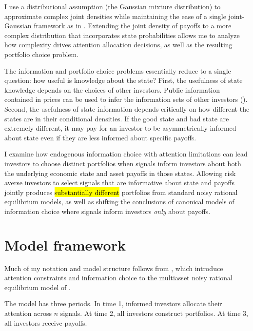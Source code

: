 \documentclass{article}
\begin{document}
I use a distributional assumption (the Gaussian mixture distribution) to approximate complex joint densities while maintaining the ease of a single joint-Gaussian framework as in \textcite{kacperczyk_rational_2016}. Extending the joint density of payoffs to a more complex distribution that incorporates state probabilities allows me to analyze how complexity drives attention allocation decisions, as well as the resulting portfolio choice problem.

The information and portfolio choice problems essentially reduce to a single question: how useful is knowledge about the state? First, the usefulness of state knowledge depends on the choices of other investors. Public information contained in prices can be used to infer the information sets of other investors (\textcite{grossman_existence_1977}). Second, the usefulness of state information depends critically on how different the states are in their conditional densities. If the good state and bad state are extremely different, it may pay for an investor to be asymmetrically informed about state even if they are less informed about specific payoffs.

I examine how endogenous information choice with attention limitations can lead investors to choose distinct portfolios when signals inform investors about both the underlying economic state and asset payoffs in those states. Allowing risk averse investors to select signals that are informative about state and payoffs jointly produces \hl{substantially different}  portfolios from standard noisy rational equilibrium models, as well as shifting the conclusions of canonical models of information choice where signals inform investors \textit{only} about payoffs.


\section{Model framework}

Much of my notation and model structure follows from \textcite{kacperczyk_rational_2016}, which introduce attention constraints and information choice to the multiasset noisy rational equilibrium model of \textcite{admati_noisy_1985}.

The model has three periods. In time 1, informed investors allocate their attention across $n$ signals. At time 2, all investors construct portfolios. At time 3, all investors receive payoffs.
\end{document}
